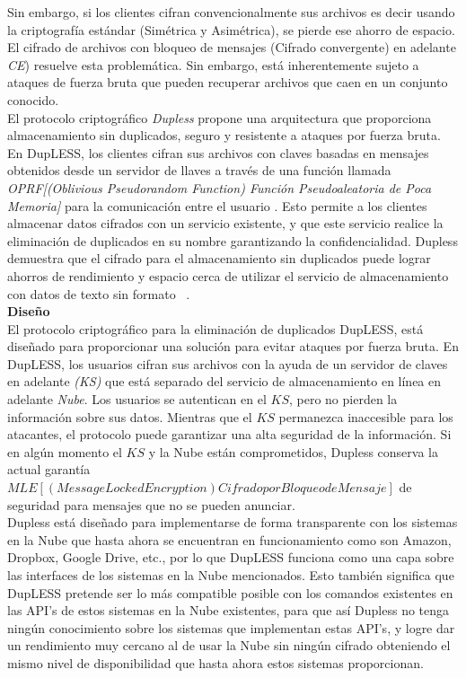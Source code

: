 Sin embargo, si los clientes cifran convencionalmente sus archivos es decir usando la criptografía estándar (Simétrica y Asimétrica), se pierde ese ahorro de espacio. El cifrado de archivos con bloqueo de mensajes (Cifrado convergente) en adelante \textit{CE}) resuelve esta problemática. Sin embargo, está inherentemente sujeto a ataques de fuerza bruta que pueden recuperar archivos que caen en un conjunto conocido.\\

El protocolo criptográfico \textit{Dupless} propone una arquitectura que proporciona almacenamiento sin duplicados, seguro y resistente a ataques por fuerza bruta. En DupLESS, los clientes cifran sus archivos con claves basadas en mensajes obtenidos
desde un servidor de llaves a través de una función llamada \textit{OPRF[(Oblivious Pseudorandom Function) Función Pseudoaleatoria de Poca Memoria] } para la comunicación entre el usuario . Esto permite a los clientes almacenar datos cifrados con un servicio existente, y que este servicio realice la eliminación de duplicados en su nombre garantizando la confidencialidad. Dupless demuestra que el cifrado para el almacenamiento sin duplicados puede lograr ahorros de rendimiento y espacio cerca de utilizar el servicio de almacenamiento con datos de texto sin formato ~\cite{dupless}. \\



\textbf{Diseño} \\

El protocolo criptográfico para la eliminación de duplicados DupLESS, está diseñado para proporcionar una solución para evitar ataques por fuerza bruta. En DupLESS, los usuarios cifran sus archivos con la ayuda de un servidor de claves en adelante \textit{(KS)} que está separado del servicio de almacenamiento en línea en adelante \textit{Nube}. Los usuarios se autentican en el $KS$, pero no pierden la información sobre sus datos. Mientras que el $KS$ permanezca inaccesible para los atacantes, el protocolo puede garantizar una alta seguridad de la información. Si en algún momento el $KS$ y la Nube están comprometidos, Dupless conserva la actual garantía $MLE[(Message Locked Encryption) Cifrado por Bloqueo de Mensaje]$ de seguridad para mensajes que no se pueden anunciar.\\ 

Dupless está diseñado para implementarse de forma transparente con los sistemas en la Nube que hasta ahora se encuentran en funcionamiento como son Amazon, Dropbox, Google Drive, etc., por lo que DupLESS funciona como una capa sobre las interfaces de los sistemas en la Nube mencionados. Esto también significa que DupLESS pretende ser lo más compatible posible con los comandos existentes en las API's de estos sistemas en la Nube existentes, para que así Dupless no tenga ningún conocimiento sobre los sistemas que implementan estas API's, y logre dar un rendimiento muy cercano al de usar la Nube sin ningún cifrado obteniendo el mismo nivel de disponibilidad que hasta ahora estos sistemas proporcionan. \\


